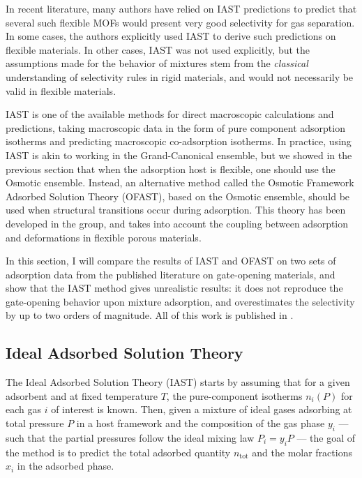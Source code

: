 \documentclass[thesis]{subfiles}
\begin{document}
In recent literature, many authors have relied on IAST predictions to
predict that several such flexible MOFs would present very good selectivity for
gas separation. In some cases, the authors explicitly used IAST to derive such
predictions on flexible materials\cite{Banerjee2014, Mukherjee2015, Foo2016,
Li2016}. In other cases, IAST was not used explicitly, but the assumptions made
for the behavior of mixtures stem from the \emph{classical} understanding of
selectivity rules in rigid materials, and would not necessarily be valid in
flexible materials\cite{Gucuyener2010, Inubushi2010, Nijem2012, Sanda2013,
Joarder2014, Mukherjee2014}.

IAST is one of the available methods for direct macroscopic calculations and
predictions, taking macroscopic data in the form of pure component adsorption
isotherms and predicting macroscopic co-adsorption isotherms. In practice, using
IAST is akin to working in the Grand-Canonical ensemble, but we showed in the
previous section that when the adsorption host is flexible, one should use the
Osmotic ensemble. Instead, an alternative method called the Osmotic Framework
Adsorbed Solution Theory (OFAST)\cite{Coudert2009}, based on the Osmotic
ensemble, should be used when structural transitions occur during adsorption.
This theory has been developed in the group\cite{Coudert2010,Ortiz2011}, and
takes into account the coupling between adsorption and deformations in flexible
porous materials.

In this section, I will compare the results of IAST and OFAST on two sets of
adsorption data from the published literature on gate-opening materials, and
show that the IAST method gives unrealistic results: it does not reproduce the
gate-opening behavior upon mixture adsorption, and overestimates the selectivity
by up to two orders of magnitude. All of this work is published in
\cite{Fraux2018}.

\subsection{Ideal Adsorbed Solution Theory}

The Ideal Adsorbed Solution Theory (IAST) starts by assuming that for a given
adsorbent and at fixed temperature $T$, the pure-component isotherms $n_i(P)$
for each gas $i$ of interest is known. Then, given a mixture of ideal gases
adsorbing at total pressure $P$ in a host framework and the composition of the
gas phase $y_i$ --- such that the partial pressures follow the ideal mixing law
$P_i = y_i P$ --- the goal of the method is to predict the total adsorbed
quantity $n_\text{tot}$ and the molar fractions $x_i$ in the adsorbed phase.
\end{document}
